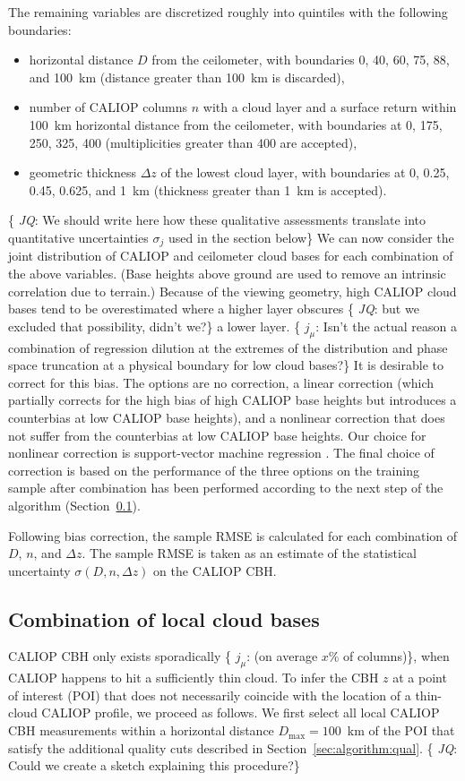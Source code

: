 \documentclass[essd,manuscript]{copernicus}\usepackage[]{graphicx}\usepackage[]{color}
\newcommand{\hlnum}[1]{\textcolor[rgb]{0.686,0.059,0.569}{#1}}%
\newcommand\comment[2]{\{\hlnum{ \textit{#1}: #2}\}}
\newcommand\commentjm[1]{\comment{$j_\mu$}{#1}}
\begin{document}
The remaining variables are discretized roughly into quintiles with the
following boundaries:
\begin{itemize}
\item horizontal distance $D$ from the ceilometer, with boundaries 0, 40, 60,
  75, 88, and 100~km (distance greater than 100~km is discarded),
\item number of CALIOP columns $n$ with a cloud layer and a surface return
  within 100~km horizontal distance from the ceilometer, with boundaries at 0,
  175, 250, 325, 400 (multiplicities greater than 400 are accepted),
\item geometric thickness $\Delta z$ of the lowest cloud layer, with boundaries
  at 0, 0.25, 0.45, 0.625, and 1~km (thickness greater than 1~km is accepted).
\end{itemize}
\comment{JQ}{We should write here how these qualitative assessments translate into
quantitative uncertainties $\sigma_j$ used in the section below}
We can now consider the joint distribution of CALIOP and ceilometer cloud bases
for each combination of the above variables.  (Base heights above ground are
used to remove an intrinsic correlation due to terrain.)  Because of the viewing
geometry, high CALIOP cloud bases tend to be overestimated where a higher layer
obscures \comment{JQ}{but we excluded that possibility, didn't we?} a lower layer.  \commentjm{Isn't the actual reason a combination of
  regression dilution at the extremes of the distribution and phase space
  truncation at a physical boundary for low cloud bases?}  It is desirable to
correct for this bias.  The options are no correction, a linear correction
(which partially corrects for the high bias of high CALIOP base heights but
introduces a counterbias at low CALIOP base heights), and a nonlinear correction
that does not suffer from the counterbias at low CALIOP base heights.  Our
choice for nonlinear correction is support-vector machine regression
\citep[SVM][]{svm}.  The final choice of correction is based on the performance
of the three options on the training sample after combination has been performed
according to the next step of the algorithm
(Section~\ref{sec:algorithm:combination}).

Following bias correction, the sample RMSE is calculated for each combination of
$D$, $n$, and $\Delta z$.  The sample RMSE is taken as an estimate of the
statistical uncertainty $\sigma(D,n,\Delta z)$ on the CALIOP CBH.

\subsection{Combination of local cloud bases}
\label{sec:algorithm:combination}
CALIOP CBH only exists sporadically \commentjm{(on average $x$\%
  of columns)}, when CALIOP happens to hit a sufficiently thin cloud.  To infer
the CBH $z$ at a point of interest (POI) that does not necessarily
coincide with the location of a thin-cloud CALIOP profile, we proceed as follows.  We first
select all local CALIOP CBH measurements within a horizontal distance
$D_\text{max} = 100$~km of the POI that satisfy the additional quality cuts
described in Section~\ref{sec:algorithm:qual}. \comment{JQ}{Could we create a sketch
explaining this procedure?}
\end{document}
